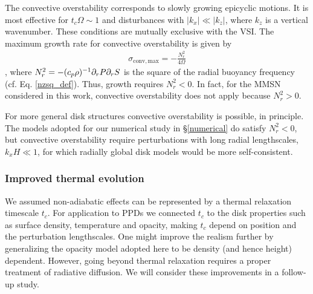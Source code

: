 The convective overstability corresponds to slowly growing epicyclic motions.
It is most effective for $t_c\Omega \sim 1$ and disturbances with
$|k_x|\ll |k_z|$, where $k_z$ is a vertical wavenumber. These
conditions are mutually exclusive with the VSI.  
The maximum growth rate for convective overstability is given by 
\begin{align}
  \sigma_\mathrm{conv,max} = -\frac{N^2_r}{4\Omega}\label{max_conv_gen}
\end{align}
\citep{lyra14}, where $N_r^2 = -(c_p\rho)^{-1}\partial_rP\partial_rS$ is the
square of the radial buoyancy frequency
(cf. Eq. \ref{nzsq_def}). Thus, growth requires $N_r^2<0$.  
In fact, for the MMSN considered in this work, convective
overstability does not apply because 
$N_r^2>0$.   

For more general disk structures convective overstability is
possible, in principle. The models adopted for our numerical study in
\S\ref{numerical} do satisfy $N_r^2<0$, but convective overstability
require perturbations with long radial lengthscales,
$k_xH\ll 1$, for which radially global disk models would be more 
self-consistent. 

\subsubsection{Improved thermal evolution} 
We assumed non-adiabatic effects can be represented by a thermal
relaxation timescale $t_c$. For  
application to PPDs we connected $t_c$ to the disk
properties such as surface density, temperature and opacity, making
$t_c$ depend on position and the perturbation 
lengthscales. One might improve the realism further by generalizing
the opacity model adopted here to be density (and hence height)
dependent.  
However, going beyond thermal relaxation requires a
proper treatment of radiative diffusion. %
We will consider these improvements in a
follow-up study. %
 




